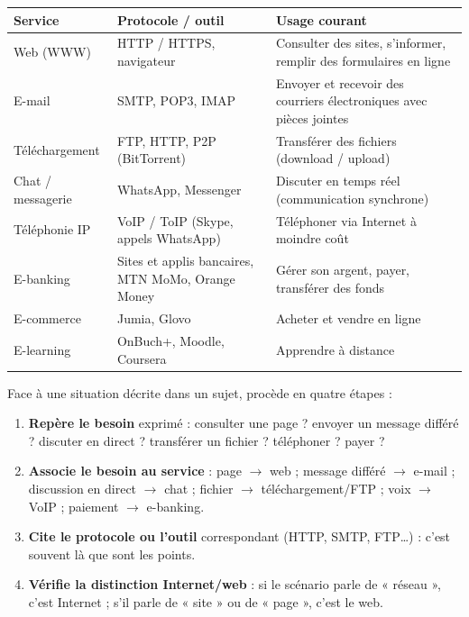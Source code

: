 \documentclass[11pt]{article}
\begin{document}
\begin{center}
\begin{tabularx}{\linewidth}{|l|l|X|}
\hline
\rowcolor{popblueL} \textbf{Service} & \textbf{Protocole / outil} & \textbf{Usage courant} \\
\hline
Web (WWW) & HTTP / HTTPS, navigateur & Consulter des sites, s'informer, remplir des formulaires en ligne \\
\hline
E-mail & SMTP, POP3, IMAP & Envoyer et recevoir des courriers électroniques avec pièces jointes \\
\hline
Téléchargement & FTP, HTTP, P2P (BitTorrent) & Transférer des fichiers (download / upload) \\
\hline
Chat / messagerie & WhatsApp, Messenger & Discuter en temps réel (communication synchrone) \\
\hline
Téléphonie IP & VoIP / ToIP (Skype, appels WhatsApp) & Téléphoner via Internet à moindre coût \\
\hline
E-banking & Sites et applis bancaires, MTN MoMo, Orange Money & Gérer son argent, payer, transférer des fonds \\
\hline
E-commerce & Jumia, Glovo & Acheter et vendre en ligne \\
\hline
E-learning & OnBuch+, Moodle, Coursera & Apprendre à distance \\
\hline
\end{tabularx}
\end{center}

\begin{methode}
Face à une situation décrite dans un sujet, procède en quatre étapes :
\begin{enumerate}
  \item \textbf{Repère le besoin} exprimé : consulter une page ? envoyer un message différé ? discuter en direct ? transférer un fichier ? téléphoner ? payer ?
  \item \textbf{Associe le besoin au service} : page $\rightarrow$ web ; message différé $\rightarrow$ e-mail ; discussion en direct $\rightarrow$ chat ; fichier $\rightarrow$ téléchargement/FTP ; voix $\rightarrow$ VoIP ; paiement $\rightarrow$ e-banking.
  \item \textbf{Cite le protocole ou l'outil} correspondant (HTTP, SMTP, FTP\ldots) : c'est souvent là que sont les points.
  \item \textbf{Vérifie la distinction Internet/web} : si le scénario parle de « réseau », c'est Internet ; s'il parle de « site » ou de « page », c'est le web.
\end{enumerate}
\end{methode}
\end{document}
